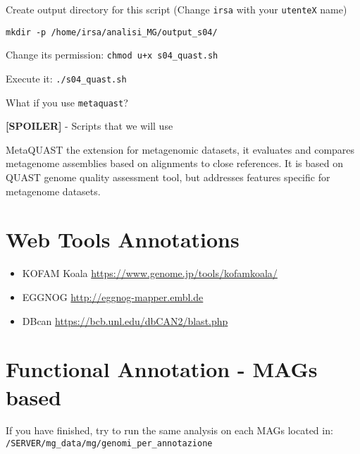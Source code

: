 \documentclass[
]{book}
\providecommand{\tightlist}{%
  \setlength{\itemsep}{0pt}\setlength{\parskip}{0pt}}
\begin{document}
Create output directory for this script (Change \texttt{irsa} with your \texttt{utenteX} name)

\begin{verbatim}
mkdir -p /home/irsa/analisi_MG/output_s04/
\end{verbatim}

Change its permission:
\texttt{chmod\ u+x\ s04\_quast.sh}

Execute it:
\texttt{./s04\_quast.sh}

What if you use \texttt{metaquast}?

\textbf{{[}SPOILER{]}} - Scripts that we will use

MetaQUAST the extension for metagenomic datasets, it evaluates and compares metagenome assemblies based on alignments to close references. It is based on QUAST genome quality assessment tool, but addresses features specific for metagenome datasets.

\section{Web Tools Annotations}\label{web-tools-annotations}

\begin{itemize}
\tightlist
\item
  KOFAM Koala \url{https://www.genome.jp/tools/kofamkoala/}
\item
  EGGNOG \url{http://eggnog-mapper.embl.de}
\item
  DBcan \url{https://bcb.unl.edu/dbCAN2/blast.php}
\end{itemize}

\section{Functional Annotation - MAGs based}\label{functional-annotation---mags-based}

If you have finished, try to run the same analysis on each MAGs located in:
\texttt{/SERVER/mg\_data/mg/genomi\_per\_annotazione}
\end{document}
